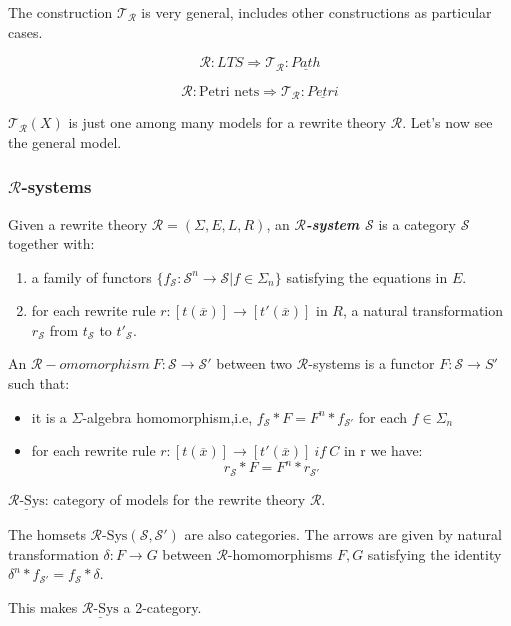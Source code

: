 \documentclass{beamer}
\begin{document}
\begin{frame}
    The construction $\mathcal{T_R}$ is very general, includes other constructions as particular cases.

    \pause
   
    $$\mathcal{R} : LTS \Rightarrow  \mathcal{T_R} : \underline{Path}$$

    \pause
    
    $$\mathcal{R} : \text{Petri nets} \Rightarrow  \mathcal{T_R} : \underline{Petri}$$

    \bigskip 
    \pause
$\mathcal{T_R}(X)$ is just one among many models for a rewrite theory $\mathcal{R}.$ Let's now see the general model.
\end{frame}
\begin{frame}
    \frametitle{$\mathcal{R}$-systems}
    \scriptsize
    Given a rewrite theory $\mathcal{R} = (\Sigma,E,L,R)$, an \emph{\textbf{$\mathcal{R}$-system $\mathcal{S}$}} is a 
    category $\mathcal{S}$ together with:
    \begin{enumerate}
        \item a family of functors $\{f_\mathcal{S}:\mathcal{S}^n \rightarrow \mathcal{S} | f \in \Sigma_n\}$
        satisfying the equations in $E$.
        \item for each rewrite rule $r:[t(\overline{x})] \rightarrow [t'(\overline{x})]$ in $R$, a natural transformation $r_\mathcal{S}$ from 
        $t_\mathcal{S}$ to $t'_\mathcal{S}$.
    \end{enumerate}

    An $\mathcal{R}-omomorphism\ F: \mathcal{S} \rightarrow \mathcal{S}'$ between two $\mathcal{R}$-systems is a 
    functor $F:\mathcal{S} \rightarrow S'$ such that:
    \begin{itemize}
        \item it is a $\Sigma$-algebra homomorphism,i.e, $f_\mathcal{S}*F = F^n*f_{\mathcal{S}'}$ for each $f \in \Sigma_n$
        \item for each rewrite rule $r:[t(\overline{x})] \rightarrow [t'(\overline{x})]\ if\ C$ in r we have: 
        $$ r_\mathcal{S} * F = F^n * r_{\mathcal{S}'} $$
    \end{itemize}

    \pause
    \bigskip
    $\underline{\mathcal{R}\text{-Sys}}$: category of models for the rewrite theory $\mathcal{R}$. 
    
    \medskip
    The homsets $\mathcal{R}\text{-Sys}(\mathcal{S},\mathcal{S'})$ are also categories.  
    The arrows are given by natural transformation $\delta:F \rightarrow G$ between $\mathcal{R}$-homomorphisms $F,G$ satisfying the identity 
    $\delta^n*f_{\mathcal{S}'}=f_\mathcal{S}*\delta$. 

    \medskip
    This makes $\underline{\mathcal{R}\text{-Sys}}$ a 2-category.
\end{frame}
\end{document}
